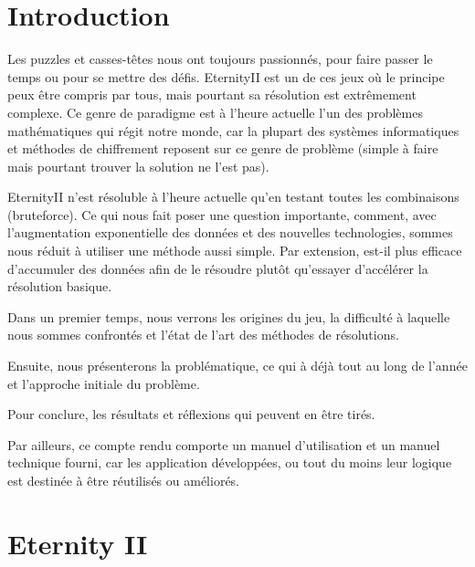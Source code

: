 \documentclass{article}
\begin{document}
	
	\renewcommand{\labelitemi}{$\bullet$}
	\renewcommand{\labelitemii}{$\cdot$}
	\renewcommand{\labelitemiii}{$\diamond$}
	\renewcommand{\labelitemiv}{$\ast$}
	
	\newcommand{\HRule}{\rule{\linewidth}{0.5mm}}
	
	
	
	
	\section{Introduction}
	
	Les puzzles et casses-têtes nous ont toujours passionnés, pour faire passer le temps ou pour se mettre des défis. EternityII est un de ces jeux où le principe peux être compris par tous, mais pourtant sa résolution est extrêmement complexe. Ce genre de paradigme est à l'heure actuelle l'un des problèmes mathématiques qui régit notre monde, car la plupart des systèmes informatiques et méthodes de chiffrement reposent sur ce genre de problème (simple à faire mais pourtant trouver la solution ne l'est pas).
	
	EternityII n'est résoluble à l'heure actuelle qu'en testant toutes les combinaisons (bruteforce). Ce qui nous fait poser une question importante, comment, avec l'augmentation exponentielle des données et des nouvelles technologies, sommes nous réduit à utiliser une méthode aussi simple.
	Par extension, est-il plus efficace d'accumuler des données afin de le résoudre plutôt qu'essayer d'accélérer la résolution basique. 
	
	Dans un premier temps, nous verrons les origines du jeu, la difficulté à laquelle nous sommes confrontés et l'état de l'art des méthodes de résolutions.
	
	Ensuite, nous présenterons la problématique, ce qui à déjà tout au long de l'année et l'approche initiale du problème.
	
	Pour conclure, les résultats et réflexions qui peuvent en être tirés.
	
	Par ailleurs, ce compte rendu comporte un manuel d'utilisation et un manuel technique fourni, car les application développées, ou tout du moins leur logique est destinée à être réutilisés ou améliorés.
	
	\section{Eternity II}
\end{document}
